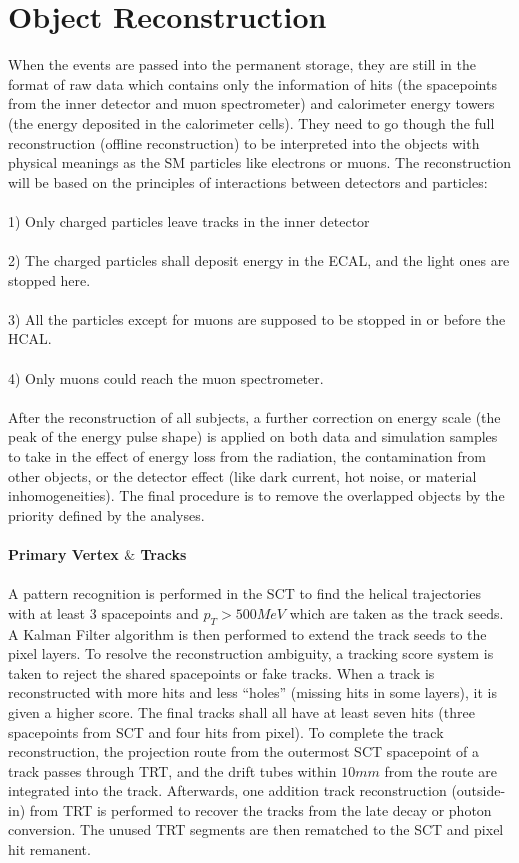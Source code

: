 \section{Object Reconstruction}
\label{sec:obj rec}
When the events are passed into the permanent storage, they are still in the format of raw data which contains only the information of hits (the spacepoints from the inner detector and muon spectrometer) and calorimeter energy towers (the energy deposited in the calorimeter cells). They need to go though the full reconstruction (offline reconstruction) to be interpreted into the objects with physical meanings as the SM particles like electrons or muons. The reconstruction will be based on the principles of interactions between detectors and particles: 
\\
\\1) Only charged particles leave tracks in the inner detector
\\
\\2) The charged particles shall deposit energy in the ECAL, and the light ones are stopped here.
\\
\\3) All the particles except for muons are supposed to be stopped in or before the HCAL.
\\
\\4) Only muons could reach the muon spectrometer. 
\\
\\After the reconstruction of all subjects, a further correction on energy scale (the peak of the energy pulse shape) is applied on both data and simulation samples to take in  the effect of energy loss from the radiation, the contamination from other objects, or the detector effect (like dark current, hot noise, or material inhomogeneities). The final procedure is to remove the overlapped objects by the priority defined by the analyses. 
\\
\\{\bf Primary Vertex $\&$ Tracks \cite{Aaboud:2017all}}
\\
\\A pattern recognition is performed in the SCT to find the helical trajectories with at least 3 spacepoints and $p_{T}>500MeV$ which are taken as the track seeds. A Kalman Filter algorithm is then performed to extend the track seeds to the pixel layers. To resolve the reconstruction ambiguity, a tracking score system is taken to reject the shared spacepoints or fake tracks. When a track is reconstructed with more hits and less ``holes'' (missing hits in some layers), it is given a higher score. The final tracks shall all have at least seven hits (three spacepoints from SCT and four hits from pixel). To complete the track reconstruction, the projection route from the outermost SCT spacepoint of a track passes through TRT, and the drift tubes within $10mm$ from the route are integrated into the track. Afterwards, one addition track reconstruction (outside-in) from TRT is performed to recover the tracks from the late decay or photon conversion. The unused TRT segments are then rematched to the SCT and pixel hit remanent.   
